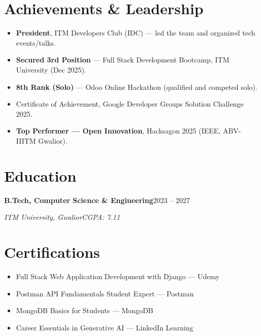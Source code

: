 \documentclass[a4paper,10pt]{article}
\newcommand{\entry}[4]{%
  \vspace{3pt}%
  \textbf{#1}\hfill #2\par
  \vspace{1pt}%
  \textit{#3}\hfill \textit{#4}\par
  \vspace{2pt}%
}
\begin{document}
\section{Achievements \& Leadership}
\begin{itemize}
  \item \textbf{President}, ITM Developers Club (IDC) --- led the team and organized tech events/talks.
  \item \textbf{Secured 3rd Position} --- Full Stack Development Bootcamp, ITM University (Dec 2025).
  \item \textbf{8th Rank (Solo)} --- Odoo Online Hackathon (qualified and competed solo).
  \item Certificate of Achievement, Google Developer Groups Solution Challenge 2025.
  \item \textbf{Top Performer --- Open Innovation}, Hacksagon 2025 (IEEE, ABV-IIITM Gwalior).
\end{itemize}

\section{Education}
\entry{B.Tech, Computer Science \& Engineering}{2023 -- 2027}{ITM University, Gwalior}{CGPA: 7.11}

\section{Certifications}
\begin{itemize}
  \item Full Stack Web Application Development with Django --- Udemy
  \item Postman API Fundamentals Student Expert --- Postman
  \item MongoDB Basics for Students --- MongoDB
  \item Career Essentials in Generative AI --- LinkedIn Learning
\end{itemize}
\end{document}
